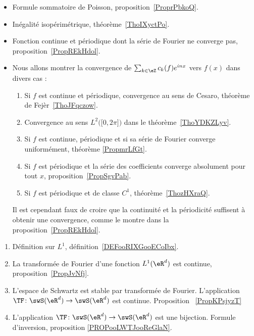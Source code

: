        \label{THMooHWEBooTMInve}
\begin{itemize}
    \item Formule sommatoire de Poisson, proposition~\ref{ProprPbkoQ}.
    \item Inégalité isopérimétrique, théorème~\ref{ThoIXyctPo}.
    \item Fonction continue et périodique dont la série de Fourier ne converge pas, proposition~\ref{PropREkHdol}.

    \item
Nous allons montrer la convergence de \( \sum_{k\in \eZ}c_k(f) e^{inx}\) vers \( f(x)\) dans divers cas :
\begin{enumerate}
    \item
        Si \( f\) est continue et périodique, convergence au sens de Cesaro, théorème de Fejèr~\ref{ThoJFqczow}.
    \item
        Convergence au sens \( L^2\Big( \mathopen[ 0 , 2\pi \mathclose] \Big)\) dans le théorème~\ref{ThoYDKZLyv}.
    \item
        Si \( f\) est continue, périodique et si sa série de Fourier converge uniformément, théorème \ref{PropmrLfGt}.
    \item
        Si \( f\) est périodique et la série des coefficients converge absolument pour tout \( x\), proposition~\ref{PropSgvPab}.
    \item
        Si \( f\) est périodique et de classe \( C^1\), théorème~\ref{ThozHXraQ}.
\end{enumerate}
Il est cependant faux de croire que la continuité et la périodicité suffisent à obtenir une convergence, comme le montre dans la proposition~\ref{PropREkHdol}.
\end{itemize}


\begin{enumerate}
    \item
        Définition sur \( L^1\), définition~\ref{DEFooRIXGooECoIbx}.
    \item
        La transformée de Fourier d'une fonction \( L^1(\eR^d)\) est continue, proposition~\ref{PropJvNfj}.
    \item
    L'espace de Schwartz est stable par transformée de Fourier. L'application $\TF\colon \swS(\eR^d)\to \swS(\eR^d)$ est continue. Proposition ~\ref{PropKPsjyzT}
\item
    L'application \( \TF\colon \swS(\eR^d)\to \swS(\eR^d)\) est une bijection. Formule d'inversion, proposition \ref{PROPooLWTJooReGlaN}.
\end{enumerate}


